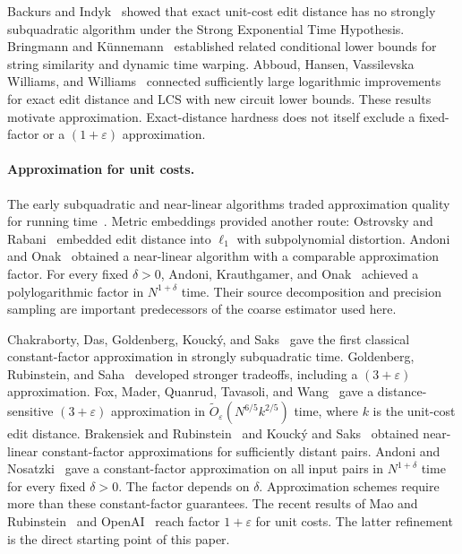 \documentclass[11pt]{article}
\theoremstyle{definition}
\newcommand{\1}{\mathbf 1}
\begin{document}
Backurs and Indyk~\cite{BI18} showed that exact unit-cost edit distance
has no strongly subquadratic algorithm under the Strong Exponential Time
Hypothesis. Bringmann and K{\"u}nnemann~\cite{BK15} established related
conditional lower bounds for string similarity and dynamic time warping.
Abboud, Hansen, Vassilevska Williams, and Williams~\cite{AHWW16}
connected sufficiently large logarithmic improvements for exact edit
distance and LCS with new circuit lower bounds.
These results motivate approximation. Exact-distance hardness does not
itself exclude a fixed-factor or a $(1+\varepsilon)$ approximation.

\paragraph{Approximation for unit costs.}
The early subquadratic and near-linear algorithms traded approximation
quality for running time~\cite{BJKK04,BES06}.
Metric embeddings provided another route: Ostrovsky and
Rabani~\cite{OR07} embedded edit distance into $\ell_1$ with
subpolynomial distortion. Andoni and Onak~\cite{AO12} obtained a
near-linear algorithm with a comparable approximation factor.
For every fixed $\delta>0$, Andoni, Krauthgamer, and
Onak~\cite{AKO10} achieved a polylogarithmic factor in
$N^{1+\delta}$ time. Their source decomposition and precision sampling are
important predecessors of the coarse estimator used here.

Chakraborty, Das, Goldenberg, Kouck{\'y}, and Saks~\cite{CDGKS20}
gave the first classical constant-factor approximation in strongly subquadratic
time. Goldenberg, Rubinstein, and Saha~\cite{GRS20} developed stronger
tradeoffs, including a $(3+\varepsilon)$ approximation.
Fox, Mader, Quanrud, Tavasoli, and Wang~\cite{FMQTW26} gave a
distance-sensitive $(3+\varepsilon)$ approximation in
$\widetilde O_\varepsilon(N^{6/5}k^{2/5})$ time, where $k$ is the
unit-cost edit distance.
Brakensiek and Rubinstein~\cite{BR20} and Kouck{\'y} and
Saks~\cite{KS20} obtained near-linear constant-factor approximations
for sufficiently distant pairs.
Andoni and Nosatzki~\cite{AN26} gave a constant-factor approximation
on all input pairs in $N^{1+\delta}$ time for every fixed $\delta>0$.
The factor depends on $\delta$.
Approximation schemes require more than these constant-factor
guarantees. The recent results of Mao and Rubinstein~\cite{MR26}
and OpenAI~\cite{openai} reach factor $1+\varepsilon$ for unit costs.
The latter refinement is the direct starting point of this paper.
\end{document}
